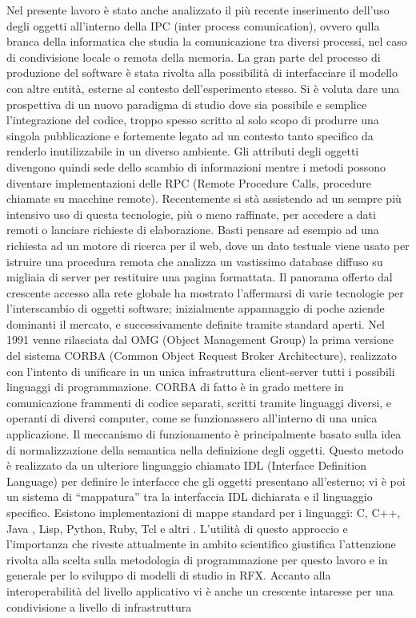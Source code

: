 Nel presente lavoro è stato anche analizzato il più recente inserimento
dell'uso degli oggetti all'interno della IPC (inter process
comunication), ovvero qulla branca della informatica che studia la
comunicazione tra diversi processi, nel caso di condivisione locale o
remota della memoria. La gran parte del processo di produzione del
software è stata rivolta alla possibilità di interfacciare il modello
con altre entità, esterne al contesto dell'esperimento stesso. Si è
voluta dare una prospettiva di un nuovo paradigma di studio dove sia
possibile e semplice l'integrazione del codice, troppo spesso scritto al
solo scopo di produrre una singola pubblicazione e fortemente legato ad
un contesto tanto specifico da renderlo inutilizzabile in un diverso
ambiente. Gli attributi degli oggetti divengono quindi sede dello
scambio di informazioni mentre i metodi possono diventare
implementazioni delle RPC (Remote Procedure Calls, procedure chiamate su
macchine remote). Recentemente si stà assistendo ad un sempre più
intensivo uso di questa tecnologie, più o meno raffinate, per accedere a
dati remoti o lanciare richieste di elaborazione. Basti pensare ad
esempio ad una richiesta ad un motore di ricerca per il web, dove un
dato testuale viene usato per istruire una procedura remota che analizza
un vastissimo database diffuso su migliaia di server per restituire una
pagina formattata. Il panorama offerto dal crescente accesso alla rete
globale ha mostrato l'affermarsi di varie tecnologie per l'interscambio
di oggetti software; inizialmente appannaggio di poche aziende dominanti
il mercato, e successivamente definite tramite standard aperti.  Nel
1991 venne rilasciata dal OMG (Object Management Group) la prima
versione del sistema CORBA (Common Object Request Broker Architecture),
realizzato con l'intento di unificare in un unica infrastruttura
client-server tutti i possibili linguaggi di programmazione.  CORBA di
fatto è in grado mettere in comunicazione frammenti di codice separati,
scritti tramite linguaggi diversi, e operanti di diversi computer, come
se funzionassero all'interno di una unica applicazione. Il meccanismo di
funzionamento è principalmente basato sulla idea di normalizzazione
della semantica nella definizione degli oggetti. Questo metodo è
realizzato da un ulteriore linguaggio chiamato IDL (Interface Definition
Language) per definire le interfacce che gli oggetti presentano
all'esterno; vi è poi un sistema di ``mappatura'' tra la interfaccia IDL
dichiarata e il linguaggio specifico. Esistono implementazioni di mappe
standard per i linguaggi: C, C++, Java , Lisp, Python, Ruby, Tcl e altri
\cite{url_corba}.  L'utilità di questo approccio e l'importanza che
riveste attualmente in ambito scientifico giustifica l'attenzione
rivolta alla scelta sulla metodologia di programmazione per questo
lavoro e in generale per lo sviluppo di modelli di studio in
RFX. Accanto alla interoperabilità del livello applicativo vi è anche un
crescente intaresse per una condivisione a livello di infrastruttura

